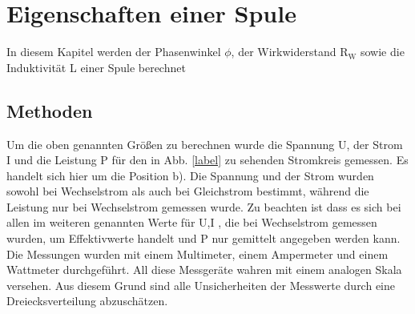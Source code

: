\section{Eigenschaften einer Spule}
In diesem Kapitel werden der Phasenwinkel $\phi$, der Wirkwiderstand R$_\text{W}$ sowie die Induktivität L einer Spule berechnet

\subsection{Methoden}
Um die oben genannten Größen zu berechnen wurde die Spannung U, der Strom I und die Leistung P für den in Abb. \ref{label} zu sehenden Stromkreis gemessen. Es handelt sich hier um die Position b).
Die Spannung und der Strom wurden sowohl bei Wechselstrom als auch bei Gleichstrom bestimmt, während die Leistung nur bei Wechselstrom gemessen wurde. Zu beachten ist dass es sich bei allen im weiteren genannten Werte für U,I , die bei Wechselstrom gemessen wurden, um Effektivwerte handelt und P nur gemittelt angegeben werden kann.
Die Messungen wurden mit einem Multimeter, einem Ampermeter und einem Wattmeter durchgeführt.
All diese Messgeräte wahren mit einem analogen Skala versehen. Aus diesem Grund sind alle Unsicherheiten der Messwerte durch eine Dreiecksverteilung abzuschätzen. 
